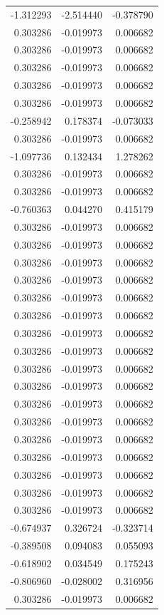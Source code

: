 \documentclass[a4paper,twoside,12pt]{book}
\begin{document}
\begin{appendices}
\begin{table}
\begin{tabular}{rrr}
	-1.312293 & -2.514440 & -0.378790 \\
	 0.303286 & -0.019973 &  0.006682 \\
	 0.303286 & -0.019973 &  0.006682 \\
	 0.303286 & -0.019973 &  0.006682 \\
	 0.303286 & -0.019973 &  0.006682 \\
	 0.303286 & -0.019973 &  0.006682 \\
	-0.258942 &  0.178374 & -0.073033 \\
	 0.303286 & -0.019973 &  0.006682 \\
	-1.097736 &  0.132434 &  1.278262 \\
	 0.303286 & -0.019973 &  0.006682 \\
	 0.303286 & -0.019973 &  0.006682 \\
	-0.760363 &  0.044270 &  0.415179 \\
	 0.303286 & -0.019973 &  0.006682 \\
	 0.303286 & -0.019973 &  0.006682 \\
	 0.303286 & -0.019973 &  0.006682 \\
	 0.303286 & -0.019973 &  0.006682 \\
	 0.303286 & -0.019973 &  0.006682 \\
	 0.303286 & -0.019973 &  0.006682 \\
	 0.303286 & -0.019973 &  0.006682 \\
	 0.303286 & -0.019973 &  0.006682 \\
	 0.303286 & -0.019973 &  0.006682 \\
	 0.303286 & -0.019973 &  0.006682 \\
	 0.303286 & -0.019973 &  0.006682 \\
	 0.303286 & -0.019973 &  0.006682 \\
	 0.303286 & -0.019973 &  0.006682 \\
	 0.303286 & -0.019973 &  0.006682 \\
	 0.303286 & -0.019973 &  0.006682 \\
	 0.303286 & -0.019973 &  0.006682 \\
	 0.303286 & -0.019973 &  0.006682 \\
	-0.674937 &  0.326724 & -0.323714 \\
	-0.389508 &  0.094083 &  0.055093 \\
	-0.618902 &  0.034549 &  0.175243 \\
	-0.806960 & -0.028002 &  0.316956 \\
	 0.303286 & -0.019973 &  0.006682 \\

\end{tabular}
\end{table}
\end{appendices}
\end{document}
